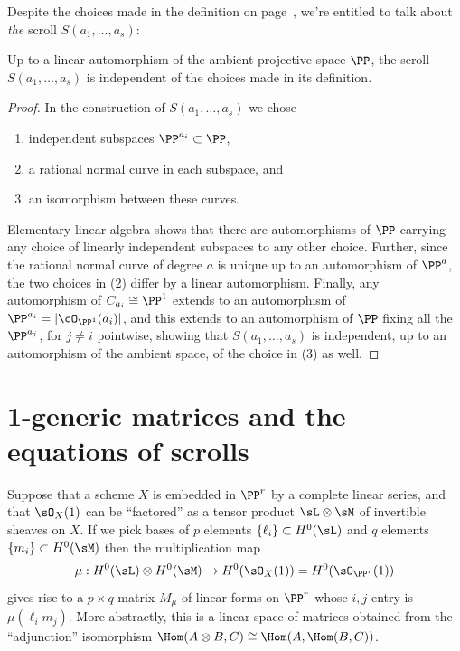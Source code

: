 Despite the choices made in the definition 
on page~\pageref{thescroll}, we're entitled to talk about
{\it the\/} scroll $S(a_1,\dots,a_s)$:

\begin{proposition}\label{uniqueness of scrolls}
Up to a linear automorphism of the ambient projective space $\PP$, 
the scroll $S(a_1,\dots,a_s)$ is independent of the choices made in its
definition.
\unif
\end{proposition}

\begin{proof}
In the construction of
$S(a_{1},\dots,a_{s})$ we chose
\begin{enumerate}
\item independent subspaces $\PP^{a_i}\subset \PP$,
\item a rational normal curve in each subspace, and
\item an isomorphism between these curves.
\end{enumerate}
Elementary linear algebra shows that there are automorphisms of $\PP$
carrying any choice of linearly independent subspaces to any other choice. Further,
since the rational normal curve of degree $a$ is unique up to an
automorphism of $\PP^{a}$, the two choices in (2) differ by a linear
automorphism. Finally, any automorphism of $C_{a_{i}}\cong \PP^{1}$
extends to an automorphism of $\PP^{a_{i}} = |\cO_{\PP^{1}}(a_{i})|$, and
this extends to an automorphism of $\PP$ fixing all the 
$\PP^{a_{j}}$, for $j\neq i$ pointwise,
showing that $S(a_{1},\dots, a_{s})$ is independent, up to an automorphism of
the ambient space, of the choice in (3)  as well.
\end{proof}

\section{1-generic matrices and the equations of scrolls}\label{particular
name}

Suppose that a scheme $X $ is embedded in $\PP^r$ by a 
%
complete linear series,
%
and that
$\sO_X(1)$ can be ``factored'' as a tensor product $\sL\otimes
\sM$ of invertible sheaves on $X$. If we pick bases of $p$  elements
$\{\ell_i\}\subset H^0(\sL)$ and  $q$  elements $\{m_i\} \subset H^0(\sM)$
then the multiplication map
%
$$
\mu: H^0(\sL) \otimes H^0(\sM) \to H^0(\sO_{X}(1))= H^0(\sO_{\PP^r}(1))
$$
gives rise to
a $p\times q$ matrix $M_\mu$ of linear forms on $\PP^r$ whose $i,j$
entry is $\mu(\ell_im_j)$.
More abstractly, this is a linear space of matrices obtained from the
``adjunction'' isomorphism
$\Hom(A\otimes B, C)\cong \Hom(A, \Hom(B,C))$.


